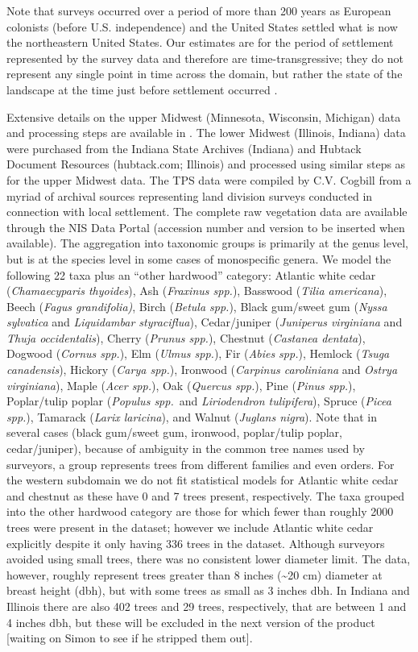 \documentclass[12pt]{article}\usepackage[]{graphicx}\usepackage[]{color}
\begin{document}
Note that surveys occurred over a period of more than 200 years as
European colonists (before U.S. independence) and the United States
settled what is now the northeastern United States. Our estimates
are for the period of settlement represented by the survey data and
therefore are time-transgressive; they do not represent any single
point in time across the domain, but rather the state of the landscape
at the time just before settlement occurred \citep{Whit:1996,Cogb:etal:2002}.

Extensive details on the upper Midwest (Minnesota, Wisconsin, Michigan)
data and processing steps are available in \cite{Gori:etal:2015}.
The lower Midwest (Illinois, Indiana) data were purchased from the
Indiana State Archives (Indiana) and Hubtack Document Resources (hubtack.com;
Illinois) and processed using similar steps as for the upper Midwest
data. The TPS data were compiled by C.V. Cogbill from a myriad of
archival sources representing land division surveys conducted in connection
with local settlement. The complete raw vegetation data are available
through the NIS Data Portal (accession number and version to be inserted
when available). The aggregation into taxonomic groups is primarily
at the genus level, but is at the species level in some cases of monospecific
genera. We model the following 22 taxa plus an ``other hardwood''
category: Atlantic white cedar (\emph{Chamaecyparis thyoides}), Ash
(\emph{Fraxinus spp.}), Basswood (\emph{Tilia americana}), Beech (\emph{Fagus
grandifolia)}, Birch (\emph{Betula spp.}), Black gum/sweet gum (\emph{Nyssa
sylvatica} and \emph{Liquidambar styraciflua}), Cedar/juniper (\emph{Juniperus
virginiana} and \emph{Thuja occidentalis}), Cherry (\emph{Prunus spp.}),
Chestnut (\emph{Castanea dentata}), Dogwood (\emph{Cornus spp.}),
Elm (\emph{Ulmus spp.}), Fir (\emph{Abies spp.}), Hemlock (\emph{Tsuga
canadensis}), Hickory (\emph{Carya spp.}), Ironwood (\emph{Carpinus
caroliniana} and \emph{Ostrya virginiana}), Maple (\emph{Acer spp.}),
Oak (\emph{Quercus spp.}), Pine (\emph{Pinus spp.}), Poplar/tulip
poplar (\emph{Populus spp.}~and \emph{Liriodendron tulipifera}),
Spruce (\emph{Picea spp.}), Tamarack (\emph{Larix laricina}), and
Walnut (\emph{Juglans nigra}). Note that in several cases (black gum/sweet
gum, ironwood, poplar/tulip poplar, cedar/juniper), because of ambiguity
in the common tree names used by surveyors, a group represents trees
from different families and even orders. For the western subdomain
we do not fit statistical models for Atlantic white cedar and chestnut
as these have 0 and 7 trees present, respectively. The taxa grouped
into the other hardwood category are those for which fewer than roughly
2000 trees were present in the dataset; however we include Atlantic
white cedar explicitly despite it only having 336 trees in the dataset.
Although surveyors avoided using small trees, there was no consistent
lower diameter limit. The data, however, roughly represent trees greater
than 8 inches (\textasciitilde{}20 cm) diameter at breast height (dbh),
but with some trees as small as 3 inches dbh. In Indiana and Illinois
there are also 402 trees and 29 trees, respectively, that are between
1 and 4 inches dbh, but these will be excluded in the next version
of the product {[}waiting on Simon to see if he stripped them out{]}. 
\end{document}
